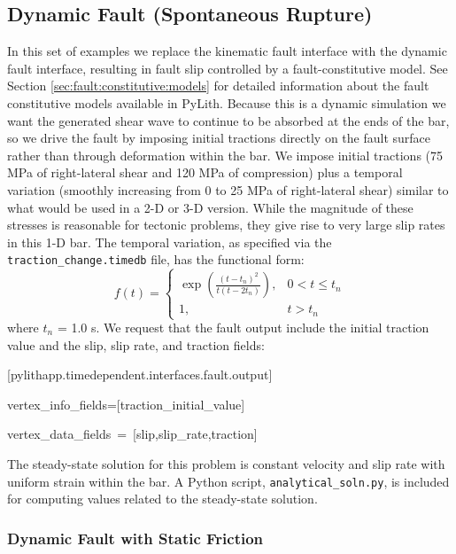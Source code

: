 \subsection{Dynamic Fault (Spontaneous Rupture)}

In this set of examples we replace the kinematic fault interface with
the dynamic fault interface, resulting in fault slip controlled by
a fault-constitutive model. See Section \vref{sec:fault:constitutive:models}
for detailed information about the fault constitutive models available
in PyLith. Because this is a dynamic simulation we want the generated
shear wave to continue to be absorbed at the ends of the bar, so we
drive the fault by imposing initial tractions directly on the fault
surface rather than through deformation within the bar. We impose
initial tractions (75 MPa of right-lateral shear and 120 MPa of compression)
plus a temporal variation (smoothly increasing from 0 to 25 MPa of
right-lateral shear) similar to what would be used in a 2-D or 3-D
version. While the magnitude of these stresses is reasonable for tectonic
problems, they give rise to very large slip rates in this 1-D bar.
The temporal variation, as specified via the \texttt{traction\_change.timedb}
file, has the functional form:
\begin{equation}
f(t)=\begin{cases}
\exp\left(\frac{\left(t-t_{n}\right)^{2}}{t\left(t-2t_{n}\right)}\right), & 0<t\le t_{n}\\
1, & t>t_{n}
\end{cases}
\end{equation}
where $t_{n}$ = 1.0 s. We request that the fault output include the
initial traction value and the slip, slip rate, and traction fields:
\begin{lyxcode}
{[}pylithapp.timedependent.interfaces.fault.output{]}

vertex\_info\_fields={[}traction\_initial\_value{]}

vertex\_data\_fields~=~{[}slip,slip\_rate,traction{]}
\end{lyxcode}
The steady-state solution for this problem is constant velocity and
slip rate with uniform strain within the bar. A Python script, \texttt{analytical\_soln.py},
is included for computing values related to the steady-state solution.


\subsubsection{Dynamic Fault with Static Friction}

